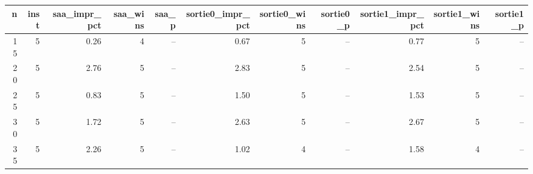 \begin{tabular}{rrrrrrrrrrr}
\toprule
n & inst & saa_impr_pct & saa_wins & saa_p & sortie0_impr_pct & sortie0_wins & sortie0_p & sortie1_impr_pct & sortie1_wins & sortie1_p \\
\midrule
15 & 5 & 0.26 & 4 & -- & 0.67 & 5 & -- & 0.77 & 5 & -- \\
20 & 5 & 2.76 & 5 & -- & 2.83 & 5 & -- & 2.54 & 5 & -- \\
25 & 5 & 0.83 & 5 & -- & 1.50 & 5 & -- & 1.53 & 5 & -- \\
30 & 5 & 1.72 & 5 & -- & 2.63 & 5 & -- & 2.67 & 5 & -- \\
35 & 5 & 2.26 & 5 & -- & 1.02 & 4 & -- & 1.58 & 4 & -- \\
\bottomrule
\end{tabular}
